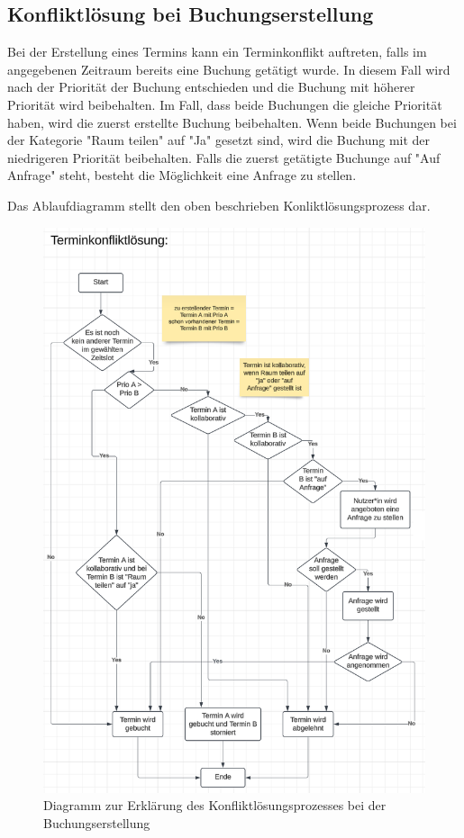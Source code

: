 \subsection{Konfliktlösung bei Buchungserstellung}

Bei der Erstellung eines Termins kann ein Terminkonflikt auftreten, falls im angegebenen Zeitraum bereits eine
Buchung getätigt wurde. In diesem Fall wird nach der Priorität der Buchung entschieden und die Buchung mit
höherer Priorität wird beibehalten. Im Fall, dass beide Buchungen die gleiche Priorität haben, wird die zuerst
erstellte Buchung beibehalten. Wenn beide Buchungen bei der Kategorie "Raum teilen" auf "Ja" gesetzt sind, wird die
Buchung mit der niedrigeren Priorität beibehalten. Falls die zuerst getätigte Buchunge auf "Auf Anfrage" steht,
besteht die Möglichkeit eine Anfrage zu stellen.

Das Ablaufdiagramm stellt den oben beschrieben Konliktlösungsprozess dar.

\begin{figure}[ht]
    \centering
    \includegraphics[width=\textwidth]{figures/activity/terminkonfliktloesung}
    \caption{Diagramm zur Erklärung des Konfliktlösungsprozesses bei der Buchungserstellung}
    \label{fig:resolve-conflict-diagram}
\end{figure}
\clearpage

